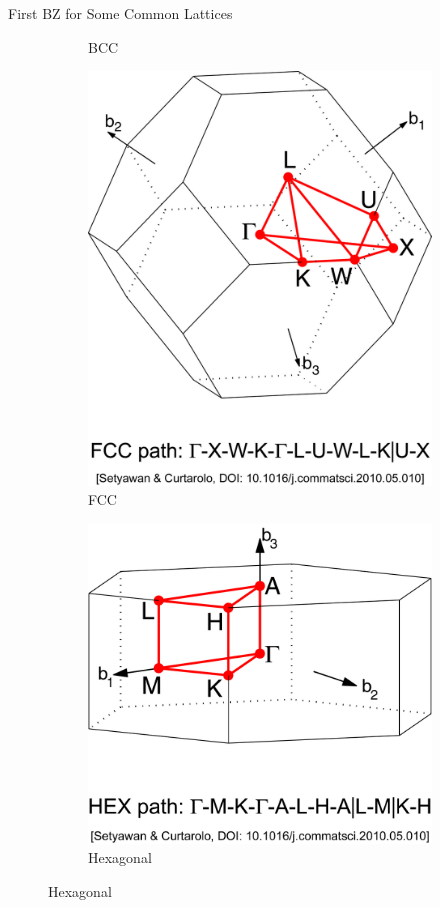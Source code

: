 \documentclass[aspectratio=169]{beamer}
\begin{document}
\begin{frame}{First BZ for Some Common Lattices}
\begin{figure}
\begin{subfigure}{0.24\textwidth}
    \caption{BCC}
    \end{subfigure}
    \begin{subfigure}{0.24\textwidth}
        \includegraphics[width=\linewidth]{lectures/figures/7_Brillouin_Zone_FCC.png}
    \caption{FCC}
    \end{subfigure}
    \begin{subfigure}{0.24\textwidth}
        \includegraphics[width=\linewidth]{lectures/figures/7_Brillouin_Zone_Hex.png}
    \caption{Hexagonal}
    \end{subfigure}
\end{figure} 


\end{frame}
\end{document}
